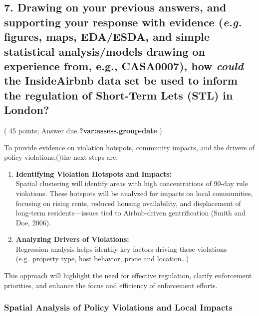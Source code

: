 \documentclass[
  a4paper,
  DIV=11,
  numbers=noendperiod]{scrartcl}
\begin{document}
\subsection{\texorpdfstring{7. Drawing on your previous answers, and
supporting your response with evidence (\emph{e.g.} figures, maps,
EDA/ESDA, and simple statistical analysis/models drawing on experience
from, e.g., CASA0007), how \emph{could} the InsideAirbnb data set be
used to inform the regulation of Short-Term Lets (STL) in
London?}{7. Drawing on your previous answers, and supporting your response with evidence (e.g. figures, maps, EDA/ESDA, and simple statistical analysis/models drawing on experience from, e.g., CASA0007), how could the InsideAirbnb data set be used to inform the regulation of Short-Term Lets (STL) in London?}}\label{drawing-on-your-previous-answers-and-supporting-your-response-with-evidence-e.g.-figures-maps-edaesda-and-simple-statistical-analysismodels-drawing-on-experience-from-e.g.-casa0007-how-could-the-insideairbnb-data-set-be-used-to-inform-the-regulation-of-short-term-lets-stl-in-london}

( 45 points; Answer due \textbf{?var:assess.group-date} )

To provide evidence on violation hotspots, community impacts, and the
drivers of policy violations,()the next steps are:

\begin{enumerate}
\def\labelenumi{\arabic{enumi}.}
\item
  \textbf{Identifying Violation Hotspots and Impacts:}\\
  Spatial clustering will identify areas with high concentrations of
  90-day rule violations. These hotspots will be analyzed for impacts on
  local communities, focusing on rising rents, reduced housing
  availability, and displacement of long-term residents---issues tied to
  Airbnb-driven gentrification (Smith and Doe, 2006).
\item
  \textbf{Analyzing Drivers of Violations:}\\
  Regression analysis helps identify key factors driving these
  violations (e.g.~property type, host behavior, pricie and
  location\ldots)
\end{enumerate}

This approach will highlight the need for effective regulation, clarify
enforcement priorities, and enhance the focus and efficiency of
enforcement efforts.

\subsubsection{Spatial Analysis of Policy Violations and Local
Impacts}\label{spatial-analysis-of-policy-violations-and-local-impacts}
\end{document}
